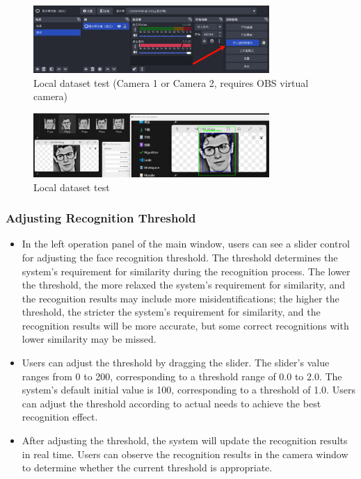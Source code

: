 \documentclass{article}
\begin{document}
\begin{figure}[H]
    \centering
    \includegraphics[width=0.8\textwidth]{Img/PixPin_2025-03-09_10-58-44.png}
    \caption{Local dataset test (Camera 1 or Camera 2, requires OBS virtual camera)}
\end{figure}

\begin{figure}[H]
    \centering
    \includegraphics[width=0.8\textwidth]{Img/PixPin_2025-03-09_11-11-17.png}
    \caption{Local dataset test}
\end{figure}

\subsubsection{Adjusting Recognition Threshold}
\begin{itemize}
    \item In the left operation panel of the main window, users can see a slider control for adjusting the face recognition threshold. The threshold determines the system's requirement for similarity during the recognition process. The lower the threshold, the more relaxed the system's requirement for similarity, and the recognition results may include more misidentifications; the higher the threshold, the stricter the system's requirement for similarity, and the recognition results will be more accurate, but some correct recognitions with lower similarity may be missed.
    \item Users can adjust the threshold by dragging the slider. The slider's value ranges from 0 to 200, corresponding to a threshold range of 0.0 to 2.0. The system's default initial value is 100, corresponding to a threshold of 1.0. Users can adjust the threshold according to actual needs to achieve the best recognition effect.
    \item After adjusting the threshold, the system will update the recognition results in real time. Users can observe the recognition results in the camera window to determine whether the current threshold is appropriate.
\end{itemize}
\end{document}
